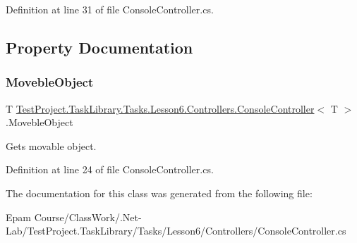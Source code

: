 Definition at line 31 of file Console\+Controller.\+cs.



\subsection{Property Documentation}
\mbox{\label{class_test_project_1_1_task_library_1_1_tasks_1_1_lesson6_1_1_controllers_1_1_console_controller_ae2fe94c44b43a6acc44c883581232c47}} 
\subsubsection{\texorpdfstring{MovebleObject}{MovebleObject}}
{\footnotesize\ttfamily T \mbox{\hyperlink{class_test_project_1_1_task_library_1_1_tasks_1_1_lesson6_1_1_controllers_1_1_console_controller}{Test\+Project.\+Task\+Library.\+Tasks.\+Lesson6.\+Controllers.\+Console\+Controller}}$<$ T $>$.Moveble\+Object\hspace{0.3cm}{\ttfamily [get]}}



Gets movable object. 



Definition at line 24 of file Console\+Controller.\+cs.



The documentation for this class was generated from the following file\+:\begin{DoxyCompactItemize}
\item 
Epam Course/\+Class\+Work/.\+Net-\/\+Lab/\+Test\+Project.\+Task\+Library/\+Tasks/\+Lesson6/\+Controllers/Console\+Controller.\+cs\end{DoxyCompactItemize}
